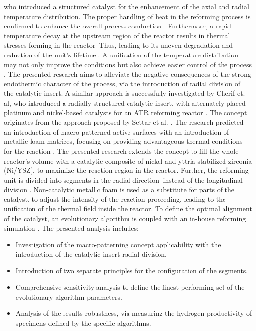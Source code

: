 \documentclass[preprint,12pt]{elsarticle}
\begin{document}
who introduced a structured catalyst for the enhancement of the axial and radial temperature distribution. The proper handling of heat in the reforming process is confirmed to enhance the overall process conduction \cite{Dubinin2018, Cherif2022a}.  Furthermore, a rapid temperature decay at the upstream region of the reactor results in thermal stresses forming in the reactor. Thus, leading to its uneven degradation and reduction of the unit's lifetime \cite{Mozdzierz2016}. A unification of the temperature distribution may not only improve the conditions but also achieve easier control of the process \cite{Mozdzierz2018}. The presented research aims to alleviate the negative consequences of the strong endothermic character of the process, via the introduction of radial division of the catalytic insert. A similar approach is successfully investigated by Cherif et. al, who introduced a radially-structured catalytic insert, with alternately placed platinum and nickel-based catalysts for an ATR reforming reactor \cite{Cherif2022}.  The concept originates from the approach proposed by Settar et al. \cite{Settar2017}. The research predicted an introduction of macro-patterned active surfaces with an introduction of metallic foam matrices, focusing on providing advantageous thermal conditions for the reaction \cite{Settar2018a, Settar2018c}.  The presented research extends the concept to fill the whole reactor's volume with a catalytic composite of nickel and yttria-stabilized zirconia (Ni/YSZ), to maximize the reaction region in the reactor. Further, the reforming unit is divided into segments in the radial direction, instead of the longitudinal division \cite{Pajak2018}. Non-catalytic metallic foam is used as a substitute for parts of the catalyst, to adjust the intensity of the reaction proceeding, leading to the unification of the thermal field inside the reactor. To define the optimal alignment of the catalyst, an evolutionary algorithm is coupled with an in-house reforming simulation \cite{Pajak2021IJHEb}. The presented analysis includes:
 
 \begin{itemize}
 \item {Investigation of the macro-patterning concept applicability with the introduction of the catalytic insert radial division.}
 \item {Introduction of two separate principles for the configuration of the segments.}
 \item {Comprehensive sensitivity analysis to define the finest performing set of the evolutionary algorithm parameters.}
 \item {Analysis of the results robustness, via measuring the hydrogen productivity of specimens defined by the specific algorithms.}
 \end{itemize}
\end{document}

